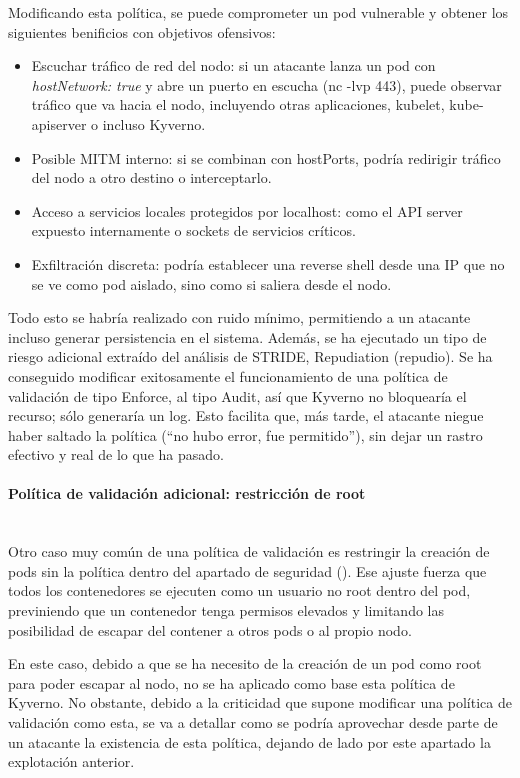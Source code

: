 \documentclass[12pt,twoside,titlepage]{report}
\begin{document}
Modificando esta política, se puede comprometer un pod vulnerable y obtener los siguientes benificios con objetivos ofensivos:
\begin{itemize}
    \item Escuchar tráfico de red del nodo: si un atacante lanza un pod con \textit{hostNetwork: true} y abre un puerto en escucha (nc -lvp 443), puede observar tráfico que va hacia el nodo, incluyendo otras aplicaciones, kubelet, kube-apiserver o incluso Kyverno.
    \item Posible MITM interno: si se combinan con hostPorts, podría redirigir tráfico del nodo a otro destino o interceptarlo.
    \item Acceso a servicios locales protegidos por localhost: como el API server expuesto internamente o sockets de servicios críticos.
    \item Exfiltración discreta: podría establecer una reverse shell desde una IP que no se ve como pod aislado, sino como si saliera desde el nodo.
\end{itemize}

Todo esto se habría realizado con ruido mínimo, permitiendo a un atacante incluso generar persistencia en el sistema. Además, se ha ejecutado un tipo de riesgo adicional extraído del análisis de STRIDE, Repudiation (repudio). Se ha conseguido modificar exitosamente el funcionamiento de una política de validación de tipo Enforce, al tipo Audit, así que Kyverno no bloquearía el recurso; sólo generaría un log. Esto facilita que, más tarde, el atacante niegue haber saltado la política (“no hubo error, fue permitido”), sin dejar un rastro efectivo y real de lo que ha pasado.

\paragraph{Política de validación adicional: restricción de root \\ \\}

Otro caso muy común de una política de validación es restringir la creación de pods sin la política  dentro del apartado de seguridad (). Ese ajuste fuerza que todos los contenedores se ejecuten como un usuario no root dentro del pod, previniendo que un contenedor tenga permisos elevados y limitando las posibilidad de escapar del contener a otros pods o al propio nodo.

En este caso, debido a que se ha necesito de la creación de un pod como root para poder escapar al nodo, no se ha aplicado como base esta política de Kyverno. No obstante, debido a la criticidad que supone modificar una política de validación como esta, se va a detallar como se podría aprovechar desde parte de un atacante la existencia de esta política, dejando de lado por este apartado la explotación anterior.
\end{document}
